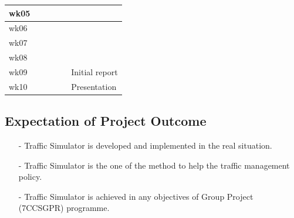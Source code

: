\documentclass[11pt]{article}
\begin{document}
\begin{table}[h]
\begin{tabular}{|l|l|l|l|l|l|}
wk05                                                            &                                                                    & \cellcolor[HTML]{FFCCC9}                                  & \cellcolor[HTML]{FFCCC9}                                                   &                          &                                        \\ \hline
wk06                                                            &                                                                    & \cellcolor[HTML]{FFCCC9}                                  & \cellcolor[HTML]{FFCCC9}                                                   &                          &                                        \\ \hline
wk07                                                            &                                                                    &                                                           & \cellcolor[HTML]{FFCCC9}                                                   & \cellcolor[HTML]{FFCCC9} &                                        \\ \hline
wk08                                                            &                                                                    &                                                           &                                                                            & \cellcolor[HTML]{FFCCC9} &                                        \\ \hline
wk09                                                            &                                                                    &                                                           &                                                                            & \cellcolor[HTML]{FFCCC9} & \cellcolor[HTML]{FFCCC9}Initial report \\ \hline
wk10                                                            &                                                                    &                                                           &                                                                            &                          & \cellcolor[HTML]{FFCCC9}Presentation   \\ \hline
\end{tabular}
\end{table}


\subsection{Expectation of Project Outcome}
\begin{itemize}
\item[-] Traffic Simulator is developed and implemented in the real situation.
\item[-] Traffic Simulator is the one of the method to help the traffic management policy.
\item[-] Traffic Simulator is achieved in any objectives of Group Project (7CCSGPR) programme.
\end{itemize}
\end{document}
